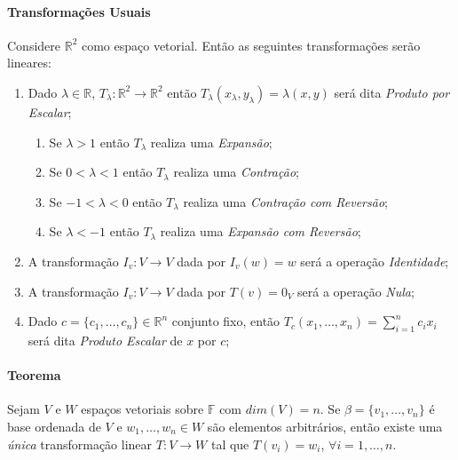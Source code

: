 \documentclass{article}
\begin{document}
            \paragraph{Transformações Usuais}Considere $\mathbb{R}^{2}$ como espaço vetorial. Então as seguintes transformações serão lineares:
                \begin{enumerate}[noitemsep]
                    \item Dado $\lambda\in\mathbb{R}$, $T_{\lambda}:\mathbb{R}^{2}\rightarrow\mathbb{R}^{2}$ então $T_{\lambda}(x_{\lambda},y_{\lambda})=\lambda(x,y)$ será dita \textit{Produto por Escalar};
                        \begin{enumerate}[noitemsep]
                            \item Se $\lambda>1$ então $T_{\lambda}$ realiza uma \textit{Expansão};
                            \item Se $0<\lambda<1$ então $T_{\lambda}$ realiza uma \textit{Contração};
                            \item Se $-1<\lambda<0$ então $T_{\lambda}$ realiza uma \textit{Contração com Reversão};
                            \item Se $\lambda<-1$ então $T_{\lambda}$ realiza uma \textit{Expansão com Reversão};
                        \end{enumerate}
                    \item A transformação $I_{v}:V\rightarrow V$ dada por $I_{v}(w)=w$ será a operação \textit{Identidade};
                    \item A transformação $I_{v}:V\rightarrow V$ dada por $T(v)=0_{V}$ será a operação \textit{Nula};
                    \item Dado $c=\{c_{1},\dots,c_{n}\}\in\mathbb{R}^{n}$ conjunto fixo, então $T_{c}(x_{1},\dots,x_{n})=\sum\limits_{i=1}^{n}c_{i}x_{i}$ será dita \textit{Produto Escalar} de $x$ por $c$;
                \end{enumerate}

            \paragraph{Teorema}Sejam $V$ e $W$ espaços vetoriais sobre $\mathbb{F}$ com $dim(V)=n$. Se $\beta=\{v_{1},\dots,v_{n}\}$ é base ordenada de $V$ e $w_{1},\dots,w_{n}\in W$ são elementos arbitrários, então existe uma \textit{única} transformação linear $T:V\rightarrow W$ tal que $T(v_{i})=w_{i}$, $\forall i=1,\dots,n$.
\newpage
\end{document}
